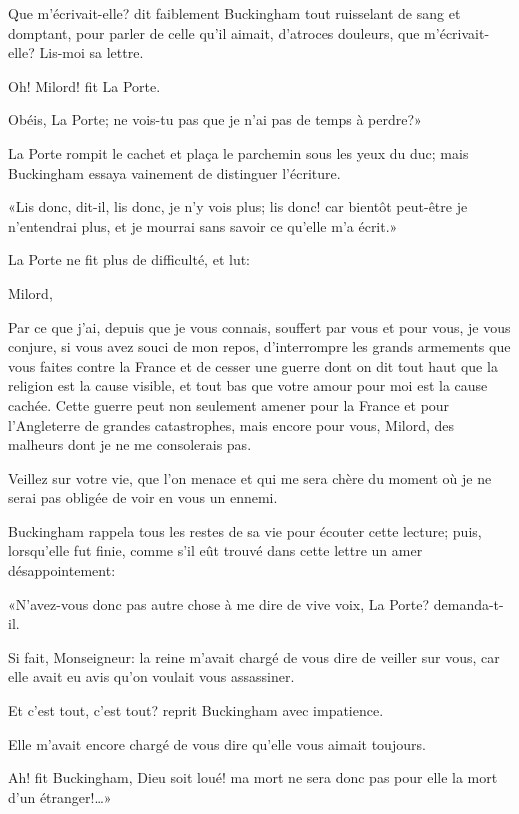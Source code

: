 \speak  Que m'écrivait-elle? dit faiblement Buckingham tout ruisselant de sang et domptant, pour parler de celle qu'il aimait, d'atroces douleurs, que m'écrivait-elle? Lis-moi sa lettre. 

\speak  Oh! Milord! fit La Porte. 

\speak  Obéis, La Porte; ne vois-tu pas que je n'ai pas de temps à perdre?» 

La Porte rompit le cachet et plaça le parchemin sous les yeux du duc; mais Buckingham essaya vainement de distinguer l'écriture. 

«Lis donc, dit-il, lis donc, je n'y vois plus; lis donc! car bientôt peut-être je n'entendrai plus, et je mourrai sans savoir ce qu'elle m'a écrit.» 

La Porte ne fit plus de difficulté, et lut: 

\begin{mail}{}{Milord,}
	
Par ce que j'ai, depuis que je vous connais, souffert par vous et pour vous, je vous conjure, si vous avez souci de mon repos, d'interrompre les grands armements que vous faites contre la France et de cesser une guerre dont on dit tout haut que la religion est la cause visible, et tout bas que votre amour pour moi est la cause cachée. Cette guerre peut non seulement amener pour la France et pour l'Angleterre de grandes catastrophes, mais encore pour vous, Milord, des malheurs dont je ne me consolerais pas.

Veillez sur votre vie, que l'on menace et qui me sera chère du moment où je ne serai pas obligée de voir en vous un ennemi.

\end{mail}

Buckingham rappela tous les restes de sa vie pour écouter cette lecture; puis, lorsqu'elle fut finie, comme s'il eût trouvé dans cette lettre un amer désappointement: 

«N'avez-vous donc pas autre chose à me dire de vive voix, La Porte? demanda-t-il. 

\speak  Si fait, Monseigneur: la reine m'avait chargé de vous dire de veiller sur vous, car elle avait eu avis qu'on voulait vous assassiner. 

\speak  Et c'est tout, c'est tout? reprit Buckingham avec impatience. 

\speak  Elle m'avait encore chargé de vous dire qu'elle vous aimait toujours. 

\speak  Ah! fit Buckingham, Dieu soit loué! ma mort ne sera donc pas pour elle la mort d'un étranger!\dots» 

